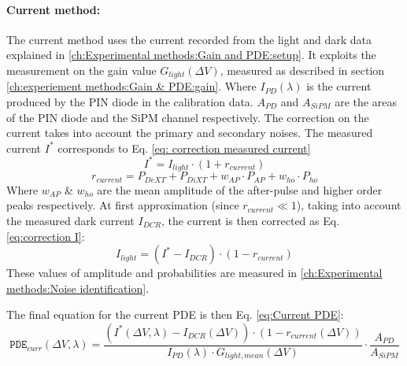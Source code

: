 \paragraph{Current method:} The current method uses the current recorded from the light and dark data explained in \ref{ch:Experimental methods:Gain and PDE:setup}. 
It exploits the measurement on the gain value $G_{light}(\Delta V)$, measured as described in section \ref{ch:experiement methods:Gain & PDE:gain}. 
Where $I_{PD}(\lambda)$ is the current produced by the PIN diode in the calibration data. $A_{PD}$ and $A_{SiPM}$ are the areas of the PIN diode and the SiPM channel respectively. 
The correction on the current takes into account the primary and secondary noises. The measured current $I^*$ corresponds to Eq. \eqref{eq: correction measured current}
\begin{equation}
    I^{*}= I_{light}\cdot(1+ r_{current})
    \label{eq: correction measured current}
\end{equation}
\begin{equation*}
    r_{current } =P_{DeXT} + P_{DiXT}+ w_{AP}\cdot P_{AP} + w_{ho}\cdot P_{ho}
    \label{eq: correction r current}  
\end{equation*}
Where $ w_{AP}$ \& $w_{ho}$ are the mean amplitude of the after-pulse and higher order peaks respectively.
At first approximation (since $r_{current} \ll 1$), taking into account the measured dark current $I_{DCR}$, the current is then corrected as Eq.\eqref{eq:correction I}:
\begin{equation}
    I_{light} = (I^{*}-I_{DCR})\cdot(1-r_{current})
    \label{eq:correction I}
\end{equation}
These values of amplitude and probabilities are measured in \ref{ch:Experimental methods:Noise identification}.

The final equation for the current PDE is then Eq. \eqref{eq:Current PDE}:
\begin{equation}
    \texttt{PDE}_{curr}(\Delta V, \lambda) = \frac{\left(I^{*}(\Delta V, \lambda)-I_{DCR}(\Delta V)\right)\cdot(1-r_{current}(\Delta V))}{I_{PD}(\lambda)\cdot G_{light, mean}(\Delta V)}\cdot \frac{A_{PD}}{A_{SiPM}} 
    \label{eq:Current PDE}
\end{equation}


